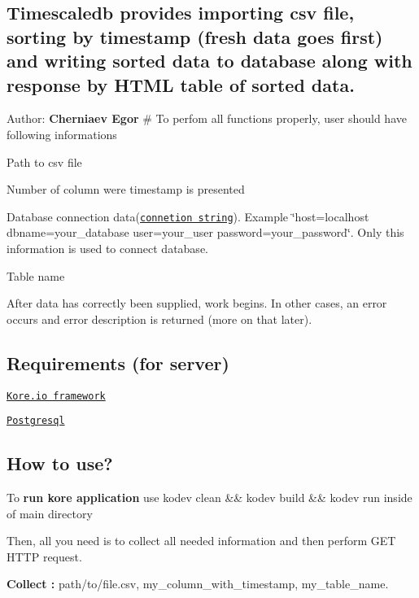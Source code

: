 \subsection*{Timescaledb provides importing csv file, sorting by timestamp (fresh data goes first) and writing sorted data to database along with response by H\+T\+ML table of sorted data.}

Author\+: {\bfseries Cherniaev Egor} \# To perfom all functions properly, user should have following informations


\begin{DoxyEnumerate}
\item Path to csv file
\item Number of column were timestamp is presented
\item Database connection data(\href{https://www.postgresql.org/docs/10/libpq-connect.html}{\tt {\ttfamily connetion string}}). Example {\ttfamily \char`\"{}host=localhost dbname=your\+\_\+database user=your\+\_\+user password=your\+\_\+password\char`\"{}}. Only this information is used to connect database.
\item Table name
\end{DoxyEnumerate}

After data has correctly been supplied, work begins. In other cases, an error occurs and error description is returned (more on that later).

\subsection*{Requirements (for server)}


\begin{DoxyItemize}
\item \href{https://kore.io/}{\tt Kore.\+io framework}
\item \href{https://www.postgresql.org/}{\tt Postgresql}
\end{DoxyItemize}

\subsection*{How to use?}

To {\bfseries run kore application} use {\ttfamily kodev clean \&\& kodev build \&\& kodev run} inside of main directory

Then, all you need is to collect all needed information and then perform G\+ET H\+T\+TP request.

{\bfseries Collect \+:} path/to/file.\+csv, my\+\_\+column\+\_\+with\+\_\+timestamp, my\+\_\+table\+\_\+name.

